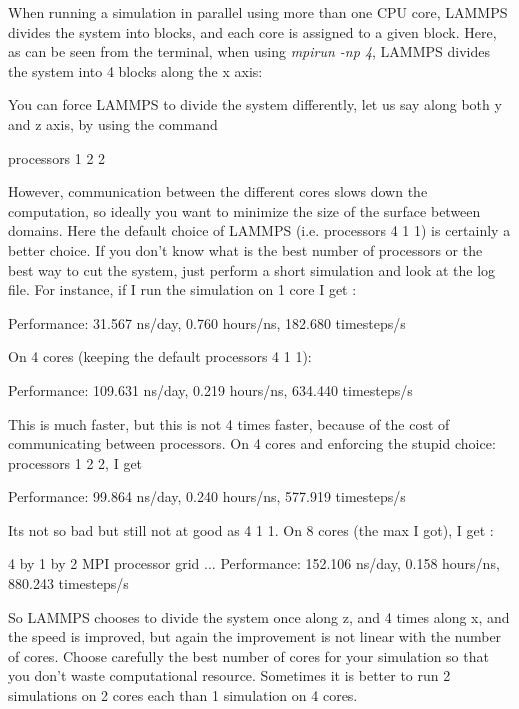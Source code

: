 \noindent \begin{tcolorbox}[colback=mylightblue!5!white,colframe=mylightblue!75!black,title=Choosing the right number of cores]
When running a simulation in parallel using more than one CPU core, LAMMPS divides the system into
blocks, and each core is assigned to a given block. Here, as can be seen
from the terminal, when using \textit{mpirun -np 4}, LAMMPS divides 
the system into 4 blocks along the x axis:
\begin{lcverbatim}
\end{lcverbatim}

\noindent You can force LAMMPS to divide the system differently, let us say along both y and z axis,
by using the command 
\begin{lcverbatim}
processors 1 2 2
\end{lcverbatim}

\noindent However, communication between the different cores slows down the computation, so ideally you want 
to minimize the size of the surface between domains. Here the default choice of LAMMPS (i.e. processors 4 1 1)
is certainly a better choice.
If you don't know what is the best number of processors or the best way to cut the system, just perform 
a short simulation and look at the log file. For instance, if I run the simulation on 1 core I get : 
\begin{lcverbatim}
Performance: 31.567 ns/day, 0.760 hours/ns, 182.680 timesteps/s
\end{lcverbatim}

\noindent On 4 cores (keeping the default processors 4 1 1):
\begin{lcverbatim}
Performance: 109.631 ns/day, 0.219 hours/ns, 634.440 timesteps/s
\end{lcverbatim}

\noindent This is much faster, but this is not 4 times faster, because of the cost of communicating between processors.
On 4 cores and enforcing the stupid choice: processors 1 2 2, I get
\begin{lcverbatim}
Performance: 99.864 ns/day, 0.240 hours/ns, 577.919 timesteps/s
\end{lcverbatim}

\noindent Its not so bad but still not at good as 4 1 1. 
On 8 cores (the max I got), I get :
\begin{lcverbatim}
4 by 1 by 2 MPI processor grid
...
Performance: 152.106 ns/day, 0.158 hours/ns, 880.243 timesteps/s
\end{lcverbatim}

\noindent So LAMMPS chooses to divide the system once along z, and 4 times along x, and the speed is improved, but again the improvement 
is not linear with the number of cores. 
Choose carefully the best number of cores for your simulation so that you don't waste computational resource.\textit{}
Sometimes it is better to run 2 simulations on 2 cores each than 1 simulation on 4 cores.\textit{}
\end{tcolorbox}

